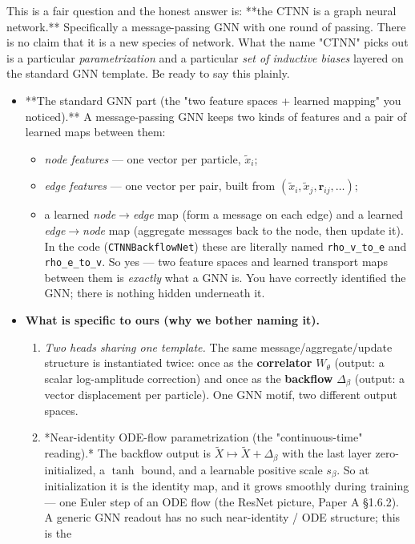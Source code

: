 \documentclass[11pt]{article}
\begin{document}
This is a fair question and the honest answer is: **the CTNN is a graph
neural network.** Specifically a message-passing GNN with one round of
passing. There is no claim that it is a new species of network. What the
name "CTNN" picks out is a particular \emph{parametrization} and a particular
\emph{set of inductive biases} layered on the standard GNN template. Be ready to
say this plainly.

\begin{itemize}
\item **The standard GNN part (the "two feature spaces + learned mapping" you
noticed).** A message-passing GNN keeps two kinds of features and a pair
of learned maps between them:
\begin{itemize}
\item \emph{node features} --- one vector per particle, $\tilde x_i$;
\item \emph{edge features} --- one vector per pair, built from $(\tilde x_i,
    \tilde x_j, \mathbf r_{ij}, \ldots)$;
\item a learned \emph{node$\to$edge} map (form a message on each edge) and a
learned \emph{edge$\to$node} map (aggregate messages back to the node, then
update it).
In the code (\texttt{CTNNBackflowNet}) these are literally named \texttt{rho\_v\_to\_e}
and \texttt{rho\_e\_to\_v}. So yes --- two feature spaces and learned transport maps
between them is \emph{exactly} what a GNN is. You have correctly identified
the GNN; there is nothing hidden underneath it.
\end{itemize}
\item \textbf{What is specific to ours (why we bother naming it).}
\begin{enumerate}
\item \emph{Two heads sharing one template.} The same message/aggregate/update
structure is instantiated twice: once as the \textbf{correlator} $W_\theta$
(output: a scalar log-amplitude correction) and once as the
\textbf{backflow} $\Delta_\beta$ (output: a vector displacement per
particle). One GNN motif, two different output spaces.
\item *Near-identity ODE-flow parametrization (the "continuous-time"
reading).* The backflow output is $\tilde X \mapsto \tilde X +
     \Delta_\beta$ with the last layer zero-initialized, a $\tanh$ bound,
and a learnable positive scale $s_\beta$. So at initialization it is
the identity map, and it grows smoothly during training --- one Euler
step of an ODE flow (the ResNet picture, Paper A \S{}1.6.2). A generic
GNN readout has no such near-identity / ODE structure; this is the

\end{enumerate}
\end{itemize}
\end{document}

